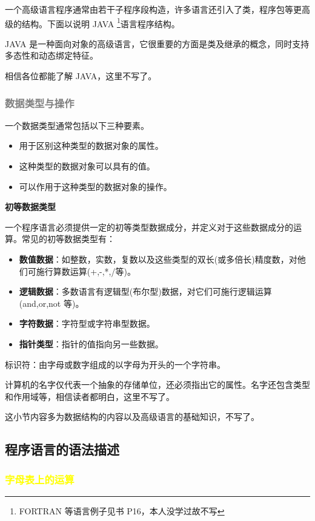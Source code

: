 一个高级语言程序通常由若干子程序段构造，许多语言还引入了类，程序包等更高级的结构。下面以说明 JAVA \footnote{FORTRAN 等语言例子见书 P16，本人没学过故不写}语言程序结构。

JAVA 是一种面向对象的高级语言，它很重要的方面是类及继承的概念，同时支持多态性和动态绑定特征。

相信各位都能了解 JAVA，这里不写了。

\subsubsection{\textcolor{grey}{数据类型与操作}}

一个数据类型通常包括以下三种要素。
\begin{itemize}
    \item 用于区别这种类型的数据对象的属性。
    \item 这种类型的数据对象可以具有的值。
    \item 可以作用于这种类型的数据对象的操作。
\end{itemize}

\noindent\textbf{初等数据类型}

一个程序语言必须提供一定的初等类型数据成分，并定义对于这些数据成分的运算。常见的初等数据类型有：
\begin{itemize}
    \item \textbf{数值数据}：如整数，实数，复数以及这些类型的双长(或多倍长)精度数，对他们可施行算数运算(+,-,*,/等)。
    \item \textbf{逻辑数据}：多数语言有逻辑型(布尔型)数据，对它们可施行逻辑运算(and,or,not 等)。
    \item \textbf{字符数据}：字符型或字符串型数据。
    \item \textbf{指针类型}：指针的值指向另一些数据。
\end{itemize}

标识符：由字母或数字组成的以字母为开头的一个字符串。

计算机的名字仅代表一个抽象的存储单位，还必须指出它的属性。名字还包含类型和作用域等，相信读者都明白，这里不写了。

这小节内容多为数据结构的内容以及高级语言的基础知识，不写了。

\subsection{程序语言的语法描述}
\subsubsection{\textcolor{mark}{字母表上的运算}}

